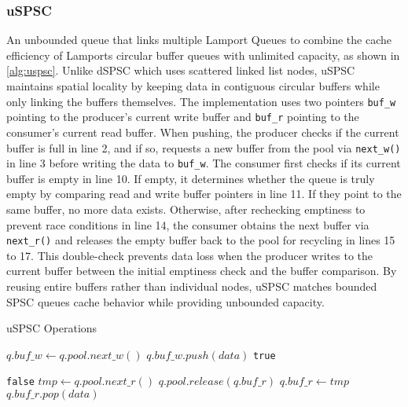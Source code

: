 \subsubsection{\acf{uSPSC}}
An unbounded queue that links multiple Lamport Queues to combine the cache efficiency of Lamports circular buffer queues with unlimited capacity, as shown in \cref{alg:uspsc}. Unlike dSPSC which uses scattered linked list nodes, uSPSC maintains spatial locality by keeping data in contiguous circular buffers while only linking the buffers themselves. The implementation uses two pointers \texttt{buf\_w} pointing to the producer's current write buffer and \texttt{buf\_r} pointing to the consumer's current read buffer. When pushing, the producer checks if the current buffer is full in line 2, and if so, requests a new buffer from the pool via \texttt{next\_w()} in line 3 before writing the data to \texttt{buf\_w}. The consumer first checks if its current buffer is empty in line 10. If empty, it determines whether the queue is truly empty by comparing read and write buffer pointers in line 11. If they point to the same buffer, no more data exists. Otherwise, after rechecking emptiness to prevent race conditions in line 14, the consumer obtains the next buffer via \texttt{next\_r()} and releases the empty buffer back to the pool for recycling in lines 15 to 17. This double-check prevents data loss when the producer writes to the current buffer between the initial emptiness check and the buffer comparison. By reusing entire buffers rather than individual nodes, uSPSC matches bounded \ac{SPSC} queues cache behavior while providing unbounded capacity. \cite{torquati2010singleproducersingleconsumerqueuessharedcache}

\begin{algorithm}[!ht]
    \centering
    \captionsetup{justification=centering}
    \caption{\ac{uSPSC} Operations\cite{torquati2010singleproducersingleconsumerqueuessharedcache}}
    \label{alg:uspsc}
    \scriptsize
    \begin{algorithmic}[1]
             
                \State $q.buf\_w \gets q.pool.next\_w()$ 
            \EndIf
            \State $q.buf\_w.push(data)$
            \State \Return \texttt{true}
        \EndFunction
        
        \State
        
                 
                    \State \Return \texttt{false} 
                \EndIf
                 
                    \State $tmp \gets q.pool.next\_r()$
                    \State $q.pool.release(q.buf\_r)$ 
                    \State $q.buf\_r \gets tmp$
                \EndIf
            \EndIf
            \State \Return $q.buf\_r.pop(data)$
        \EndFunction
    \end{algorithmic}
 \end{algorithm}

